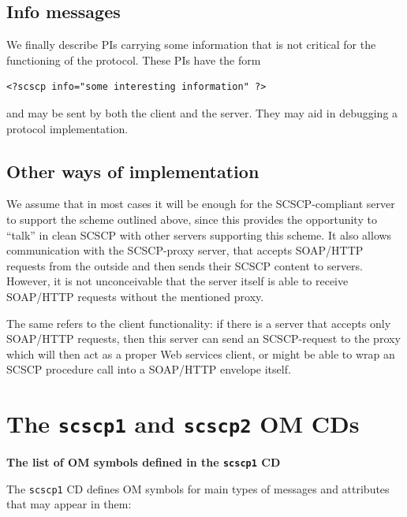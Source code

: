 \documentclass{amsart}
\begin{document}
\subsection{Info messages}
We finally describe PIs carrying some information that is not critical for the
functioning of the protocol. These PIs have the form
\begin{verbatim}
<?scscp info="some interesting information" ?>
\end{verbatim}
and may be sent by both the client and the server. They may aid in 
debugging a protocol implementation.

\subsection{Other ways of implementation}
We assume that in most cases it will be enough for the SCSCP-compliant
server to support the scheme outlined above, since this provides the
opportunity to ``talk'' in clean SCSCP with other servers supporting this
scheme.
It also allows communication with the SCSCP-proxy server, that accepts
SOAP/HTTP requests from the outside and then sends their SCSCP 
content to servers. 
However, it is not unconceivable that the server itself is able to receive
SOAP/HTTP requests without the mentioned proxy. 

The same refers to the client functionality: if there is a server
that accepts only SOAP/HTTP requests, then this server can send an SCSCP-request 
to the proxy which will then act as a proper Web services client, or might 
be able to wrap an SCSCP procedure call into a SOAP/HTTP envelope itself. 

\newpage

\appendix
\section{The {\tt scscp1} and {\tt scscp2} OM CDs}

\vspace{5pt}

\centerline{ \bf {The list of OM symbols defined in the {\tt scscp1} CD}}

\vspace{10pt}

The {\tt scscp1} CD \cite{scscp1} defines OM symbols 
for main types of messages and attributes that may appear in them:
\end{document}

